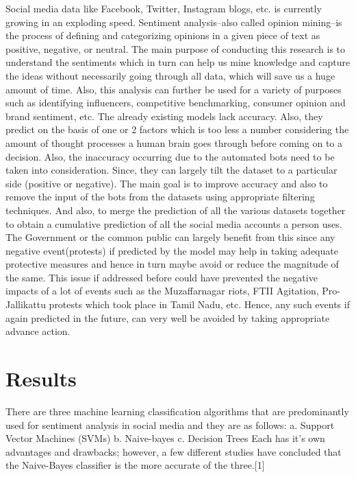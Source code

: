 \documentclass[aps,floatfix,prd,showpacs]{revtex4}
\begin{document}
Social media data like Facebook, Twitter, Instagram blogs, etc. is currently growing in an exploding speed. Sentiment analysis–also called opinion mining–is the process of defining and categorizing opinions in a given piece of text as positive, negative, or neutral. The main purpose of conducting this research is to understand the sentiments which in turn can help us mine knowledge and capture the ideas without necessarily going through all data, which will save us a huge amount of time. Also, this analysis can further be used for a variety of purposes such as identifying influencers, competitive benchmarking, consumer opinion and brand sentiment, etc.
The already existing models lack accuracy. Also, they predict on the basis of one or 2 factors which is too less a number considering the amount of thought processes a human brain goes through before coming on to a decision. Also, the inaccuracy occurring due to the automated bots need to be taken into consideration. Since, they can largely tilt the dataset to a particular side (positive or negative). 
The main goal is to improve accuracy and also to remove the input of the bots from the datasets using appropriate filtering techniques. And also, to merge the prediction of all the various datasets together to obtain a cumulative prediction of all the social media accounts a person uses.
The Government or the common public can largely benefit from this since any negative event(protests) if predicted by the model may help in taking adequate protective measures and hence in turn maybe avoid or reduce the magnitude of the same. This issue if addressed before could have prevented the negative impacts of a lot of events such as the Muzaffarnagar riots, FTII Agitation, Pro-Jallikattu protests which took place in Tamil Nadu, etc. Hence, any such events if again predicted in the future, can very well be avoided by taking appropriate advance action.   

\section{Results}
There are three machine learning classification algorithms that are predominantly used for sentiment analysis in social media and they are as follows:
a.	Support Vector Machines (SVMs)
b.	Naive-bayes
c.	Decision Trees
Each has it’s own advantages and drawbacks; however, a few different studies have concluded that the Naive-Bayes classifier is the more accurate of the three.[1]
      
\end{document}
